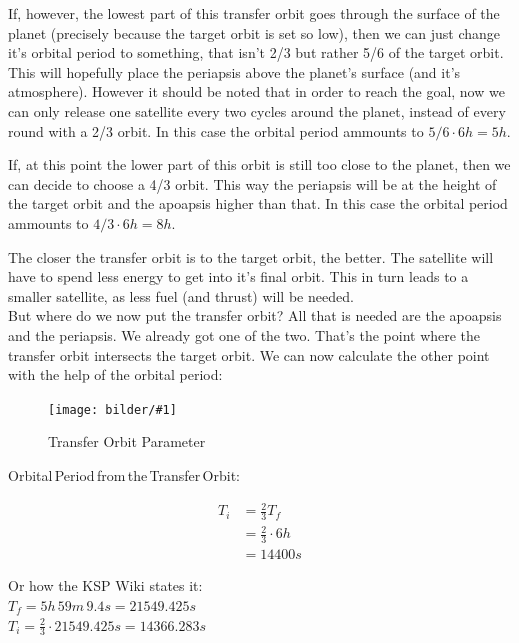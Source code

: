\documentclass[12pt,paper=A4,numbers=noenddot,bibliography=totoc,listof=totoc,DIV=11,BCOR=1mm]{scrreprt}
\newcommand{\bildscaled}[4]{%
	\begin{figure}[htbp]
	\begin{center}
	\texttt{[image: bilder/\#1]}
	\caption{#3}\label{#2}
	\end{center}
	\end{figure}
}
\begin{document}
If, however, the lowest part of this transfer orbit goes through the surface of the planet (precisely because the target orbit is set so low), then we can just change it's orbital period to something, that isn't 2/3 but rather 5/6 of the target orbit.
This will hopefully place the periapsis above the planet's surface (and it's atmosphere).
However it should be noted that in order to reach the goal, now we can only release one satellite every two cycles around the planet, instead of every round with a 2/3 orbit.
In this case the orbital period ammounts to $5/6 \cdot 6h = 5h$.

If, at this point the lower part of this orbit is still too close to the planet, then we can decide to choose a 4/3 orbit. This way the periapsis will be at the height of the target orbit and the apoapsis higher than that. In this case the orbital period ammounts to $4/3 \cdot 6h = 8h$.

The closer the transfer orbit is to the target orbit, the better. The satellite will have to spend less energy to get into it's final orbit. This in turn leads to a smaller satellite, as less fuel (and thrust) will be needed.\\

But where do we now put the transfer orbit? All that is needed are the apoapsis and the periapsis. We already got one of the two. That's the point where the transfer orbit intersects the target orbit. We can now calculate the other point with the help of the orbital period:
\bildscaled{i_orbit}{i_orbit}{Transfer Orbit Parameter}{0.7}
\pagebreak 
\begin{flushleft}
Orbital\,Period\,from\,the\,Transfer\,Orbit:
\end{flushleft}
\begin{equation} \label{eq1}
\begin{split}
T_{i} &= \frac{2}{3}T_{f} \\
      &= \frac{2}{3} \cdot 6h \\
      &= 14400s
\end{split}
\end{equation}
\begin{center}
Or how the KSP Wiki states it:\\
$T_{f} = 5h\,59m\,9.4s = 21549.425s$ \\
$T_{i} = \frac{2}{3} \cdot 21549.425s = 14366.283s$
\end{center}
\end{document}

